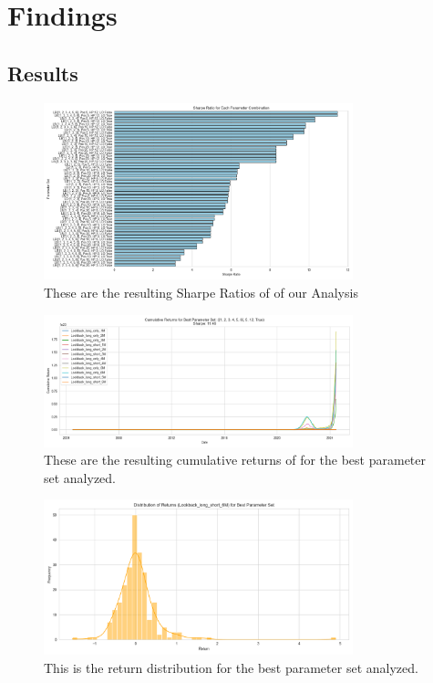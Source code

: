 \documentclass[11pt,a4paper,english,oneside]{book}
\begin{document}

\chapter{Findings}
\section{Results}
\begin{figure}[h] %
    \centering
    \includegraphics[width=0.8\textwidth]{Graphics/sharpe_ratios.png}
    \caption[Sharpe Ratios]{These are the resulting Sharpe Ratios of of our Analysis}
    \label{fig:my_label}
\end{figure}

\begin{figure}[h] %
    \centering
    \includegraphics[width=0.8\textwidth]{Graphics/cumulative_returns_best_parameters.png}
    \caption[Cumulative Returns]{These are the resulting cumulative returns of for the best parameter set analyzed.}
    \label{fig:my_label}
\end{figure}

\begin{figure}[h] %
    \centering
    \includegraphics[width=0.8\textwidth]{Graphics/return_distribution.png}
    \caption[Return Distribution]{This is the return distribution for the best parameter set analyzed.}
    \label{fig:my_label}
\end{figure}
\end{document}
